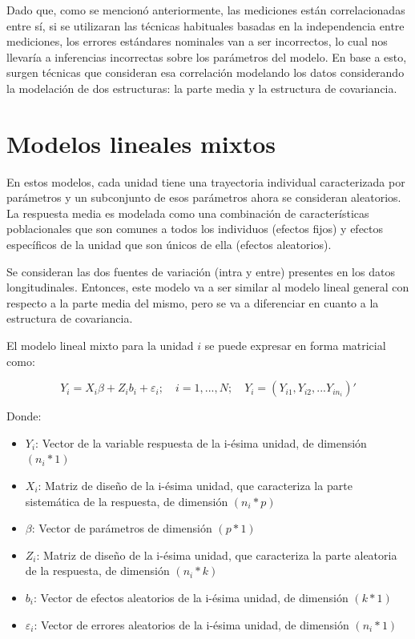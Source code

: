 \documentclass[spanish]{article}
\numberwithin{figure}{subsection}
\numberwithin{equation}{subsection}
\numberwithin{table}{subsection}
\begin{document}
Dado que, como se mencionó anteriormente, las mediciones están correlacionadas
entre sí, si se utilizaran las técnicas habituales basadas en la independencia
entre mediciones, los errores estándares nominales van a ser incorrectos, lo
cual nos llevaría a inferencias incorrectas sobre los parámetros del modelo. En
base a esto, surgen técnicas que consideran esa correlación modelando los datos
considerando la modelación de dos estructuras: la parte media y la estructura
de covariancia.

\section{Modelos lineales mixtos}

En estos modelos, cada unidad tiene una trayectoria individual caracterizada
por parámetros y un subconjunto de esos parámetros ahora se consideran
aleatorios. La respuesta media es modelada como una combinación de
características poblacionales que son comunes a todos los individuos (efectos
fijos) y efectos específicos de la unidad que son únicos de ella (efectos
aleatorios).

Se consideran las dos fuentes de variación (intra y entre) presentes en los
datos longitudinales. Entonces, este modelo va a ser similar al modelo lineal
general con respecto a la parte media del mismo, pero se va a diferenciar en
cuanto a la estructura de covariancia.

El modelo lineal mixto para la unidad $i$ se puede expresar en forma matricial
como:

\[ Y_i = X_i\beta + Z_ib_i + \varepsilon_i; \quad i = 1, ..., N;
\quad Y_i = (Y_{i1}, Y_{i2}, ... Y_{in_{i}})' \]

Donde:

\begin{itemize}
	\item $Y_i$: Vector de la variable respuesta de la i-ésima unidad, de
	dimensión $(n_i*1)$
	\item $X_i$: Matriz de diseño de la i-ésima unidad, que caracteriza la
	parte sistemática de la respuesta, de dimensión $(n_i*p)$
	\item $\beta$: Vector de parámetros de dimensión $(p*1)$
	\item $Z_i$: Matriz de diseño de la i-ésima unidad, que caracteriza la
	parte aleatoria de la respuesta, de dimensión $(n_i*k)$
	\item $b_i$: Vector de efectos aleatorios de la i-ésima unidad, de
	dimensión $(k*1)$
	\item $\varepsilon_i$: Vector de errores aleatorios de la i-ésima unidad,
	de dimensión $(n_i*1)$
\end{itemize}
\end{document}

